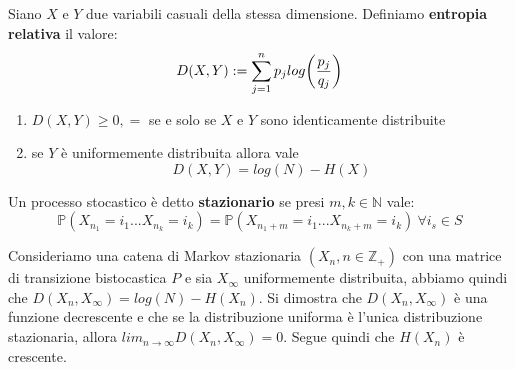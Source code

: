 \begin{defi}
Siano $X$ e $Y$ due variabili casuali della stessa dimensione.
Definiamo \textbf{entropia relativa} il valore:
\begin{equation}
D(X,Y):=\sum_{j=1}^n p_j log \bigg( \frac{p_j}{q_j} \bigg)
\end{equation}
\end{defi}
\begin{teo}
\begin{enumerate}
Per l'entropia relativa vale:
\item $D(X,Y)\geq 0, =$ se e solo se $X$ e $Y$ sono identicamente distribuite
\item se $Y$ è uniformemente distribuita allora vale
\begin{equation}
D(X,Y)=log(N)-H(X)
\end{equation}
\end{enumerate}
\end{teo}
\begin{defi}
Un processo stocastico è detto \textbf{stazionario} se presi $m,k\in \mathbb{N}$ vale:
$$\mathbb{P}(X_{n_1}=i_1...X_{n_k}=i_k)= \mathbb{P}(X_{n_1+m}=i_1...X_{n_k+m}=i_k) \ \forall i_s \in S$$
\end{defi}
Consideriamo una catena di Markov stazionaria $(X_n,n \in \mathbb{Z}_+)$ con una matrice di transizione bistocastica $P$ e sia $X_{\infty}$ uniformemente distribuita, abbiamo quindi che $D(X_n,X_{\infty})=log(N)-H(X_n)$. Si dimostra che $D(X_n,X_{\infty})$ è una funzione decrescente e che se la distribuzione uniforma è l'unica distribuzione stazionaria, allora $lim_{n \to \infty}D(X_n,X_{\infty})=0$. Segue quindi che $H(X_n)$ è crescente. \cite{Thomas}



